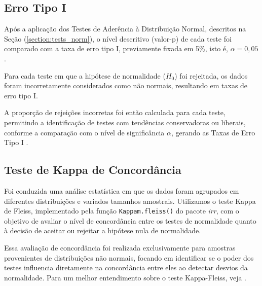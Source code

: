 \documentclass[a4paper,11pt]{article} %
\begin{document}
\subsection{Erro Tipo I} %

Após a aplicação dos Testes de Aderência à Distribuição Normal, descritos na Seção (\ref{section:tests_norm}), o nível descritivo (valor-p) de cada teste foi comparado com a taxa de erro tipo I, previamente fixada em 5\%, isto é, $\alpha = 0,05$.

\vspace{0.5cm}

Para cada teste em que a hipótese de normalidade ($H_0$) foi rejeitada, os dados foram incorretamente considerados como não normais, resultando em taxas de erro tipo I.

\vspace{0.5cm}

A proporção de rejeições incorretas foi então calculada para cada teste, permitindo a identificação de testes com tendências conservadoras ou liberais, conforme a comparação com o nível de significância $\alpha$, gerando as Taxas de Erro Tipo I \cite{carradori2014avaliaccao}.

\subsection{Teste de Kappa de Concordância} %

Foi conduzida uma análise estatística em que os dados foram agrupados em diferentes distribuições e variados tamanhos amostrais. Utilizamos o teste Kappa de Fleiss, implementado pela função \texttt{Kappam.fleiss()} do pacote \textit{irr}, com o objetivo de avaliar o nível de concordância entre os testes de normalidade quanto à decisão de aceitar ou rejeitar a hipótese nula de normalidade.

\vspace{0.5cm}

Essa avaliação de concordância foi realizada exclusivamente para amostras provenientes de distribuições não normais, focando em identificar se o poder dos testes influencia diretamente na concordância entre eles ao detectar desvios da normalidade. Para um melhor entendimento sobre o teste Kappa-Fleiss, veja \cite{fleiss1971measuring, conger1980integration, fleiss2003statistical}.
\end{document}
